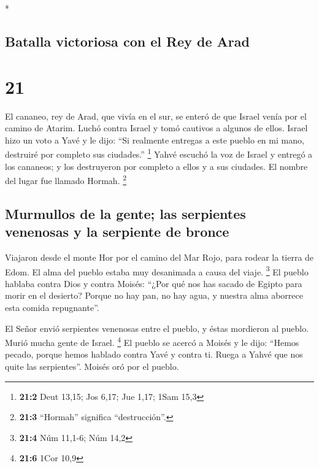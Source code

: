 \begin{paracol}{2}
\begin{otherlanguage}{english}
\end{otherlanguage}

\switchcolumn[0]*

\hypertarget{batalla-victoriosa-con-el-rey-de-arad}{%
\subsection{Batalla victoriosa con el Rey de
Arad}\label{batalla-victoriosa-con-el-rey-de-arad}}

\hypertarget{section-40}{%
\section{21}\label{section-40}}

 El cananeo, rey de Arad, que vivía en el sur, se enteró
de que Israel venía por el camino de Atarim. Luchó contra Israel y tomó
cautivos a algunos de ellos.  Israel hizo un voto a Yavé y
le dijo: ``Si realmente entregas a este pueblo en mi mano, destruiré por
completo sus ciudades.'' \footnote{\textbf{21:2} Deut 13,15; Jos 6,17;
  Jue 1,17; 1Sam 15,3}  Yahvé escuchó la voz de Israel y
entregó a los cananeos; y los destruyeron por completo a ellos y a sus
ciudades. El nombre del lugar fue llamado Hormah. \footnote{\textbf{21:3}
  ``Hormah'' significa ``destrucción''.}

\hypertarget{murmullos-de-la-gente-las-serpientes-venenosas-y-la-serpiente-de-bronce}{%
\subsection{Murmullos de la gente; las serpientes venenosas y la
serpiente de
bronce}\label{murmullos-de-la-gente-las-serpientes-venenosas-y-la-serpiente-de-bronce}}

 Viajaron desde el monte Hor por el camino del Mar Rojo,
para rodear la tierra de Edom. El alma del pueblo estaba muy desanimada
a causa del viaje. \footnote{\textbf{21:4} Núm 11,1-6; Núm 14,2}
 El pueblo hablaba contra Dios y contra Moisés: ``¿Por qué
nos has sacado de Egipto para morir en el desierto? Porque no hay pan,
no hay agua, y nuestra alma aborrece esta comida repugnante''.

 El Señor envió serpientes venenosas entre el pueblo, y
éstas mordieron al pueblo. Murió mucha gente de Israel. \footnote{\textbf{21:6}
  1Cor 10,9}  El pueblo se acercó a Moisés y le dijo:
``Hemos pecado, porque hemos hablado contra Yavé y contra ti. Ruega a
Yahvé que nos quite las serpientes''. Moisés oró por el pueblo.


\end{paracol}
